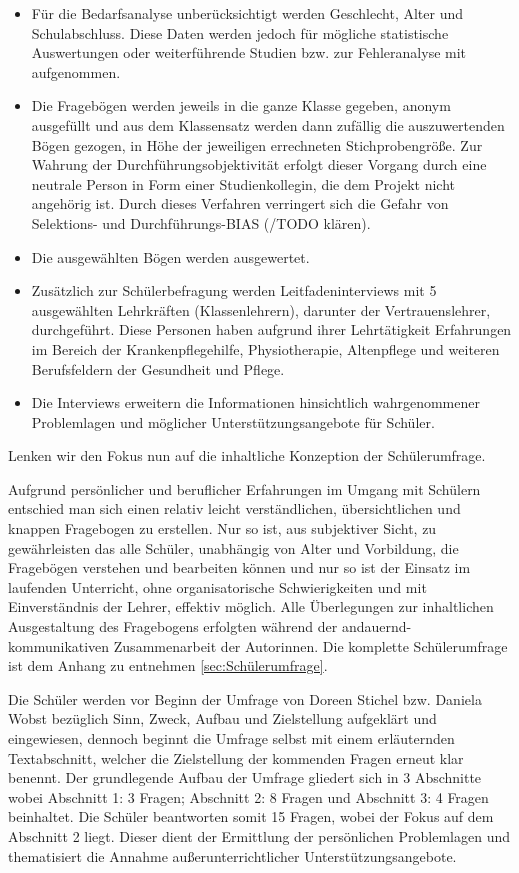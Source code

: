 \begin{itemize}
	\item Für die Bedarfsanalyse unberücksichtigt werden Geschlecht, Alter und Schulabschluss. Diese Daten werden jedoch für mögliche statistische Auswertungen oder weiterführende Studien bzw. zur Fehleranalyse mit aufgenommen.
	\item Die Fragebögen werden jeweils in die ganze Klasse gegeben, anonym ausgefüllt und aus dem Klassensatz werden dann zufällig die auszuwertenden Bögen gezogen, in Höhe der jeweiligen errechneten Stichprobengröße. Zur Wahrung der Durchführungsobjektivität erfolgt dieser Vorgang durch eine neutrale Person in Form einer Studienkollegin, die dem Projekt nicht angehörig ist. Durch dieses Verfahren verringert sich die Gefahr von Selektions- und Durchführungs-BIAS (/TODO klären).
	\item Die ausgewählten Bögen werden ausgewertet.
	\item Zusätzlich zur Schülerbefragung werden Leitfadeninterviews mit 5 ausgewählten Lehrkräften (Klassenlehrern), darunter der Vertrauenslehrer, durchgeführt. Diese Personen haben aufgrund ihrer Lehrtätigkeit Erfahrungen im Bereich der Krankenpflegehilfe, Physiotherapie, Altenpflege und  weiteren Berufsfeldern der Gesundheit und Pflege.
	\item Die Interviews erweitern die Informationen hinsichtlich wahrgenommener Problemlagen und möglicher Unterstützungsangebote für Schüler.
\end{itemize}

Lenken wir den Fokus nun auf die inhaltliche Konzeption der Schülerumfrage. 

Aufgrund persönlicher und beruflicher Erfahrungen im Umgang mit Schülern entschied man sich einen relativ leicht verständlichen, übersichtlichen und knappen Fragebogen zu erstellen. Nur so ist, aus subjektiver Sicht, zu gewährleisten das alle Schüler, unabhängig von Alter und Vorbildung, die Fragebögen verstehen und bearbeiten können und nur so ist der Einsatz im laufenden Unterricht, ohne organisatorische Schwierigkeiten und mit Einverständnis der Lehrer, effektiv möglich. Alle Überlegungen zur inhaltlichen Ausgestaltung des Fragebogens erfolgten während der andauernd-kommunikativen Zusammenarbeit der Autorinnen. Die komplette Schülerumfrage ist dem Anhang zu entnehmen \ref{sec:Schülerumfrage}. 

Die Schüler werden vor Beginn der Umfrage von Doreen Stichel bzw. Daniela Wobst bezüglich Sinn, Zweck, Aufbau und Zielstellung aufgeklärt und eingewiesen, dennoch beginnt die Umfrage selbst mit einem erläuternden Textabschnitt, welcher die Zielstellung der kommenden Fragen erneut klar benennt. Der grundlegende Aufbau der Umfrage gliedert sich in 3 Abschnitte wobei Abschnitt 1: 3 Fragen; Abschnitt 2: 8 Fragen und Abschnitt 3: 4 Fragen beinhaltet. Die Schüler beantworten somit 15 Fragen, wobei der Fokus auf dem Abschnitt 2 liegt. Dieser dient der Ermittlung der persönlichen Problemlagen und thematisiert die Annahme außerunterrichtlicher Unterstützungsangebote. 

